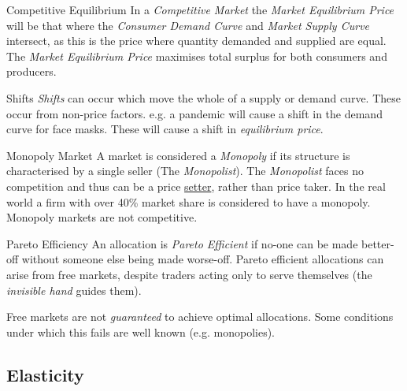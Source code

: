 \documentclass[11pt,a4paper]{article}
\begin{document}
  \begin{definition}{Competitive Equilibrium}
    In a \textit{Competitive Market} the \textit{Market Equilibrium Price} will be that where the \textit{Consumer Demand Curve} and \textit{Market Supply Curve} intersect, as this is the price where quantity demanded and supplied are equal. The \textit{Market Equilibrium Price} maximises total surplus for both consumers and producers.
  \end{definition}

  \begin{definition}{Shifts}
    \textit{Shifts} can occur which move the whole of a supply or demand curve. These occur from non-price factors. e.g. a pandemic will cause a shift in the demand curve for face masks. These will cause a shift in  \textit{equilibrium price}.
  \end{definition}

  \begin{definition}{Monopoly Market}
    A market is considered a \textit{Monopoly} if its structure is characterised by a single seller (The \textit{Monopolist}). The \textit{Monopolist} faces no competition and thus can be a price \underline{setter}, rather than price taker. In the real world a firm with over 40\% market share is considered to have a monopoly. Monopoly markets are not competitive.
  \end{definition}

  \begin{definition}{Pareto Efficiency}
    An allocation is \textit{Pareto Efficient} if no-one can be made better-off without someone else being made worse-off. Pareto efficient allocations can arise from free markets, despite traders acting only to serve themselves (the \textit{invisible hand} guides them).
    \par Free markets are not \textit{guaranteed} to achieve optimal allocations. Some conditions under which this fails are well known (e.g. monopolies).
  \end{definition}

\subsection{Elasticity}
\end{document}

